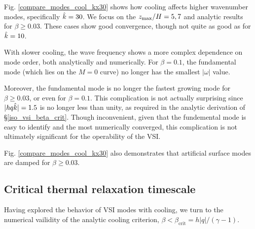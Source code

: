 Fig. \ref{compare_modes_cool_kx30} shows how cooling affects higher wavenumber
modes, specifically $\hat{k}=30$.   We focus on the $z_\mathrm{max}/H = 5, 7$ and analytic results for $\beta \geq 0.03$. 
These cases  show good convergence, though not quite as good as for $\hat{k} = 10$.

With slower cooling, the wave frequency shows a more complex 
dependence on mode order, both analytically and numerically. For $\beta = 0.1$,
 the fundamental mode (which lies on the $M = 0$ curve) no longer has the smallest $|\omega|$ value.  

Moreover, the fundamental mode is no longer the fastest growing mode for $\beta \geq 0.03$, or even 
for $\beta = 0.1$.  This complication is not actually surprising since $|hq\hat{k}| = 1.5$ is no longer less than unity,
as required in the analytic derivation of \S\ref{iso_vsi_beta_crit}.  Though  inconvenient,  given that the 
fundemental mode is easy to identify and the most numerically converged, this complication is not ultimately significant
for the operability of the VSI.  

Fig. \ref{compare_modes_cool_kx30} also demonstrates that artificial surface modes are damped for $\beta \geq 0.03$.

%



\subsection{Critical thermal relaxation
  timescale}\label{bcrit_num_test}
Having explored the behavior of VSI modes with cooling, we turn to the numerical vailidity of the 
analytic cooling criterion, $\beta < \beta_\mathrm{crit} = h|q|/(\gamma -1)$.

